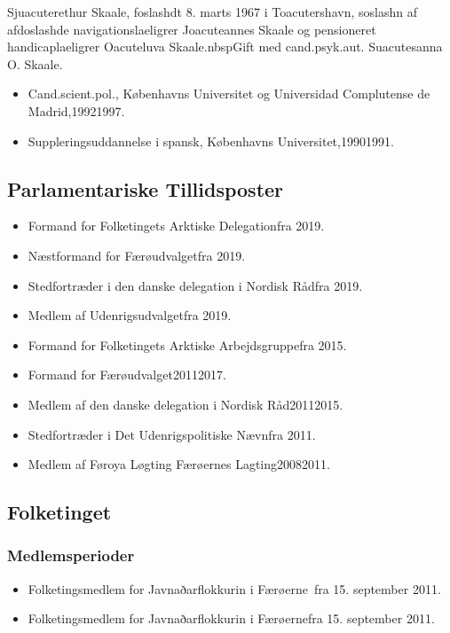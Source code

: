 \documentclass[11pt, a4paper]{awesome-cv}
\begin{document}
\makecvheader[R]
\makelettertitle
\begin{cvletter}
Sjuacuterethur Skaale, foslashdt 8. marts 1967 i Toacutershavn, soslashn af afdoslashde navigationslaeligrer Joacuteannes Skaale og pensioneret handicaplaeligrer Oacuteluva Skaale.nbspGift med cand.psyk.aut. Suacutesanna O. Skaale.

\begin{itemize}
\item Cand.scient.pol., Københavns Universitet og Universidad Complutense de Madrid,19921997.
\item Suppleringsuddannelse i spansk, Københavns Universitet,19901991.
\end{itemize}
\subsection*{Parlamentariske Tillidsposter}
\begin{itemize}
\item Formand for Folketingets Arktiske Delegationfra 2019.
\item Næstformand for Færøudvalgetfra 2019.
\item Stedfortræder i den danske delegation i Nordisk Rådfra 2019.
\item Medlem af Udenrigsudvalgetfra 2019.
\item Formand for Folketingets Arktiske Arbejdsgruppefra 2015.
\item Formand for Færøudvalget20112017.
\item Medlem af den danske delegation i Nordisk Råd20112015.
\item Stedfortræder i Det Udenrigspolitiske Nævnfra 2011.
\item Medlem af Føroya Løgting Færøernes Lagting20082011.
\end{itemize}
\subsection*{Folketinget}
\subsubsection*{Medlemsperioder}
\begin{itemize}
\item Folketingsmedlem for Javnaðarflokkurin i Færøerne fra 15. september 2011.
\item Folketingsmedlem for Javnaðarflokkurin i Færøernefra 15. september 2011.
\end{itemize}

\end{cvletter}
\end{document}

